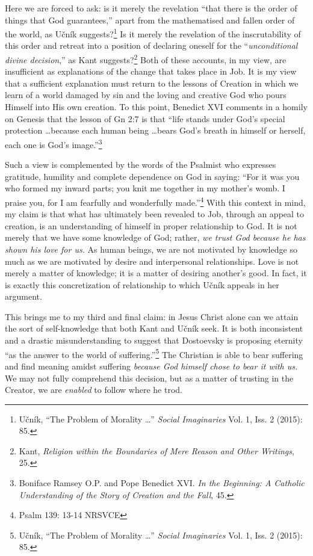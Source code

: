 \documentclass[12pt]{article}
\begin{document}
	Here we are forced to ask: is it merely the revelation ``that there is the order of things that God guarantees,'' apart from the mathematised and fallen order of the world, as U\v{c}n\'{i}k suggests?\footnote{U\v{c}n\'{i}k, ``The Problem of Morality \ldots'' \emph{Social Imaginaries} Vol. 1, Iss. 2 (2015): 85.} Is it merely the revelation of the inscrutability of this order and retreat into a position of declaring oneself for the ``\emph{unconditional divine decision},'' as Kant suggests?\footnote{Kant, \emph{Religion within the Boundaries of Mere Reason and Other Writings}, 25.} Both of these accounts, in my view, are insufficient as explanations of the change that takes place in Job. It is my view that a sufficient explanation must return to the lessons of Creation in which we learn of a world damaged by sin and the loving and creative God who pours Himself into His own creation. To this point, Benedict XVI comments in a homily on Genesis that the lesson of Gn 2:7 is that ``life stands under God's special protection \ldots because each human being \ldots bears God's breath in himself or herself, each one is God's image.''\footnote{ Boniface Ramsey O.P. and Pope Benedict XVI. \emph{In the Beginning: A Catholic Understanding of the Story of Creation and the Fall}, 45.} 
	
	Such a view is complemented by the words of the Psalmist who expresses gratitude, humility and complete dependence on God in saying: ``For it was you who formed my inward parts; you knit me together in my mother's womb. I praise you, for I am fearfully and wonderfully made.''\footnote{Psalm 139: 13-14 NRSVCE} With this context in mind, my claim is that what has ultimately been revealed to Job, through an appeal to creation, is an understanding of himself in proper relationship to God. It is not merely that we have some knowledge of God; rather, \emph{we trust God because he has shown his love for us.} As human beings, we are not motivated by knowledge so much as we are motivated by desire and interpersonal relationships. Love is not merely a matter of knowledge; it is a matter of desiring another's good. In fact, it is exactly this concretization of relationship to which U\v{c}n\'{i}k appeals in her argument. 
	
	This brings me to my third and final claim: in Jesus Christ alone can we attain the sort of self-knowledge that both Kant and U\v{c}n\'{i}k seek. It is both inconsistent and a drastic misunderstanding to suggest that Dostoevsky is proposing eternity ``as the answer to the world of suffering.''\footnote{U\v{c}n\'{i}k, ``The Problem of Morality \ldots'' \emph{Social Imaginaries} Vol. 1, Iss. 2 (2015): 85.} The Christian is able to bear suffering and find meaning amidst suffering \emph{because God himself chose to bear it with us.} We may not fully comprehend this decision, but as a matter of trusting in the Creator, we are \emph{enabled} to follow where he trod.
	
\end{document}
